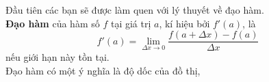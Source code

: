 Đầu tiên các bạn sẽ được làm quen với lý thuyết về đạo hàm.\\
\textbf{Đạo hàm} của hàm số $f$ tại giá trị $a$, kí hiệu bởi $f'(a)$, là
    \begin{equation}
        f'(a)=\lim_{\Delta x\rightarrow 0}\frac{f(a+\Delta x)-f(a)}{\Delta x}
    \end{equation}
nếu giới hạn này tồn tại.\\
Đạo hàm có một ý nghĩa là độ dốc của đồ thị,